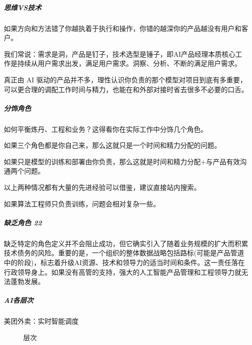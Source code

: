 \documentclass[letterpaper,11pt,english]{sphinxmanual}
\begin{document}
\subparagraph{思维VS技术}
\label{\detokenize{chapter_introduction/AI_PM:vs}}
如果方向和方法错了你越执着于执行和操作，你错的越深你的产品越没有用户和客户。

我们常说：需求是洞，产品是钉子，技术选型是锤子，即AI产品经理本质核心工作是持续从用户需求出发，满足用户需求。洞察、分析、不断的满足用户需求。

真正由 AI
驱动的产品并不多，理性认识你负责的那个模型对项目到底有多重要，可以更合理的调配工作时间与精力，也能在和外部对接时省去很多不必要的口舌。


\subparagraph{分饰角色}
\label{\detokenize{chapter_introduction/AI_PM:id16}}
如何平衡炼丹、工程和业务？这得看你在实际工作中分饰几个角色。

如果三个角色都是你自己来，那么这就只是一个时间和精力分配的问题。

如果只是模型的训练和部署由你负责，那么这就是时间和精力分配+与产品有效沟通两个问题。

以上两种情况都有大量的先进经验可以借鉴，建议直接站内搜索。

如果算法工程师只负责训练，问题会相对复杂一些。


\subparagraph{缺乏角色 22\sphinxfootnotemark[94]}
\label{\detokenize{chapter_introduction/AI_PM:id17}}%
\begin{footnotetext}[94]\sphinxAtStartFootnote
{}
%
\end{footnotetext}\ignorespaces 
缺乏特定的角色定义并不会阻止成功，但它确实引入了随着业务规模的扩大而积累技术债务的风险。重要的是，一个组织的整体数据战略包括路标(可能是产品管道中的阶段)，标志着升级AI资源、技术和领导力的适当时间和条件。这一责任落在行政领导身上。如果没有高管的支持，强大的人工智能产品管理和工程领导力就无法蓬勃发展。


\subparagraph{AI各层次}
\label{\detokenize{chapter_introduction/AI_PM:id18}}
美团外卖：实时智能调度

\begin{figure}[H]
\centering
\capstart

\noindent{}
\caption{层次 \sphinxfootnotemark[95]}\label{\detokenize{chapter_introduction/AI_PM:id37}}\end{figure}
%
\begin{footnotetext}[95]\sphinxAtStartFootnote
{}
%
\end{footnotetext}\ignorespaces 
\end{document}
